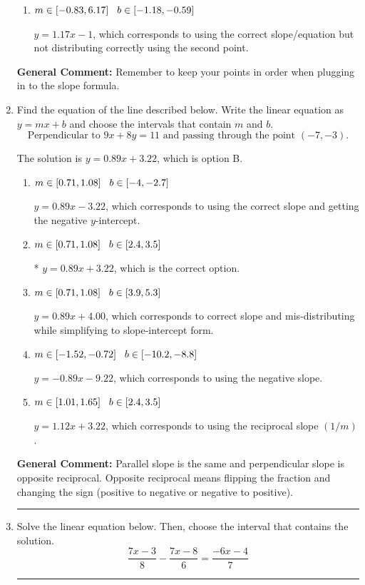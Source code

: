 \documentclass{extbook}[14pt]
\newcommand{\litem}[1]{\item #1

\rule{\textwidth}{0.4pt}}
\begin{document}
\begin{enumerate}
{\begin{enumerate}[label=\Alph*.]
 $y = 1.17x + 2.83$, which corresponds to using the correct slope and getting the negative y-intercept.
\item \( m \in [-0.83, 6.17] \hspace*{3mm} b \in [-1.18, -0.59] \)

 $y = 1.17x -1$, which corresponds to using the correct slope/equation but not distributing correctly using the second point.
\end{enumerate}

\textbf{General Comment:} Remember to keep your points in order when plugging in to the slope formula.
}
\litem{
Find the equation of the line described below. Write the linear equation as $ y=mx+b $ and choose the intervals that contain $m$ and $b$.
\[ \text{Perpendicular to } 9 x + 8 y = 11 \text{ and passing through the point } (-7, -3). \]

The solution is \( y = 0.89x + 3.22 \), which is option B.\begin{enumerate}[label=\Alph*.]
\item \( m \in [0.71, 1.08] \hspace*{3mm} b \in [-4, -2.7] \)

 $y = 0.89x - 3.22$, which corresponds to using the correct slope and getting the negative $y$-intercept.
\item \( m \in [0.71, 1.08] \hspace*{3mm} b \in [2.4, 3.5] \)

* $y = 0.89x + 3.22$, which is the correct option.
\item \( m \in [0.71, 1.08] \hspace*{3mm} b \in [3.9, 5.3] \)

 $y = 0.89x + 4.00$, which corresponds to correct slope and mis-distributing while simplifying to slope-intercept form.
\item \( m \in [-1.52, -0.72] \hspace*{3mm} b \in [-10.2, -8.8] \)

 $y = -0.89x - 9.22$, which corresponds to using the negative slope.
\item \( m \in [1.01, 1.65] \hspace*{3mm} b \in [2.4, 3.5] \)

 $y = 1.12x + 3.22$, which corresponds to using the reciprocal slope $(1/m)$.
\end{enumerate}

\textbf{General Comment:} Parallel slope is the same and perpendicular slope is opposite reciprocal. Opposite reciprocal means flipping the fraction and changing the sign (positive to negative or negative to positive).
}
\litem{
Solve the linear equation below. Then, choose the interval that contains the solution.
\[ \frac{7x -3}{8} - \frac{7x -8}{6} = \frac{-6x -4}{7} \]

}
\end{enumerate}
\end{document}
